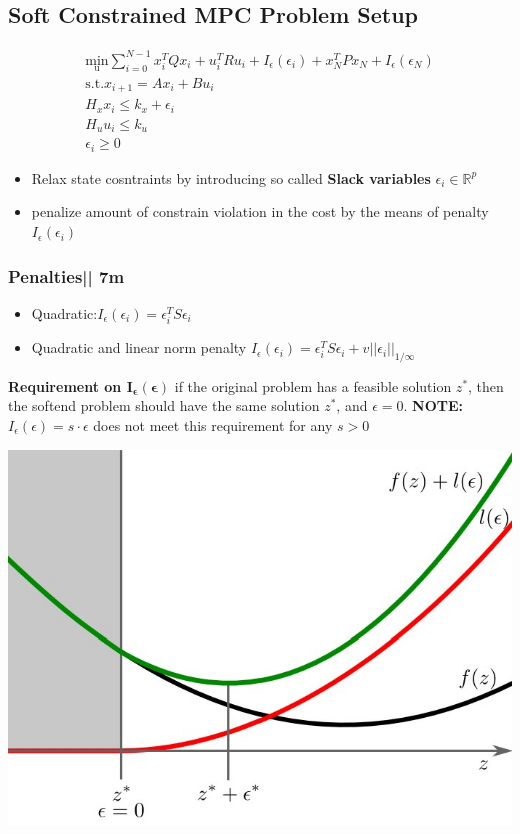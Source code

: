 \subsection{Soft Constrained MPC Problem Setup}
\begin{gather*}
    \underset{\mathrm{u}}{\mathrm{min}}\sum^{N-1}_{i=0}x_i^T Q x_i + u_i^T R u_i + I_\epsilon(\epsilon_i) + x_N^T P x_N+ I_\epsilon(\epsilon_N)\\
    \mathrm{s.t.} x_{i+1} = Ax_i+ Bu_i\\
    H_x x_i \leq k_x + \epsilon_i\\
    H_u u_i\leq k_u\\
    \epsilon_i\geq 0
\end{gather*}
\begin{itemize}
    \item Relax state cosntraints by introducing so called \textbf{Slack variables} $\epsilon_i \in \mathbb{R}^p$
    \item penalize amount of constrain violation in the cost by the means of penalty $I_\epsilon(\epsilon_i)$
\end{itemize}
\subsubsection{Penalties|| 7m}
\begin{itemize}
    \item Quadratic:$I_\epsilon(\epsilon_i) = \epsilon_i^T S \epsilon_i$
    \item Quadratic and linear norm penalty $I_\epsilon(\epsilon_i) = \epsilon_i^TS\epsilon_i+v||\epsilon_i||_{1/\infty}$
\end{itemize}

\begin{minipage}[]{0.49\linewidth}
\textbf{Requirement on $\mathbf{I_\epsilon(\epsilon)}$}
if the original problem has a feasible solution $z^*$, then the softend problem should have the same solution $z^*$, and $\epsilon = 0$.
\textbf{NOTE:} $I_\epsilon(\epsilon) = s \cdot \epsilon$ does not meet this requirement for any $s > 0$ \\
\end{minipage}
\begin{minipage}[]{0.49\linewidth}
\includegraphics[width= 0.99\linewidth]{MPC_summary/Images/Quadratic_penalty.jpg}
\end{minipage}
